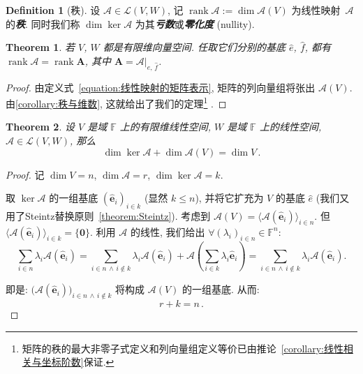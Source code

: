 \documentclass[openany]{ctexbook}
\newcommand*{\indexbf}[1]{\emph{\textbf{#1}}\index{#1}} %
\theoremstyle{plain}
\newtheorem{theorem}{Theorem}[section] %
\theoremstyle{definition}
\newtheorem{definition}{Definition}[section] %
\newcommand*{\basis}[1]{\hat{\boldsymbol{#1}}} %
\newcommand*{\bv}{\boldsymbol} %
\newcommand*{\inbasis}[2]{\left.%
	{#1}\right|_{#2}
}
\DeclareMathOperator{\rank}{rank}
\begin{document}
\begin{definition}[秩]
	设 $\mathscr A \in \mathcal L(V, W)$, 记 $\rank \mathscr A := \dim \mathscr A(V)$ 为线性映射~$\mathscr A$ 的\indexbf{秩}.
	同时我们称 $\dim \ker \mathscr A$ 为其\indexbf{亏数}或\indexbf{零化度} (nullity).
\end{definition}

\begin{theorem}
	若 $V$, $W$ 都是有限维向量空间. 任取它们分别的基底 $\hat e$, $\hat f$, 都有 $\rank \mathscr A = \rank \bv A$, 其中 $\bv A = \inbasis{\mathscr A}{\hat e,\, \hat f}$.
\end{theorem}
\begin{proof}
	由定义式~\eqref{equation:线性映射的矩阵表示}, 矩阵的列向量组将张出 $\mathscr A (V)$.
	由\ref{corollary:秩与维数}, 这就给出了我们的定理\footnote{%
	矩阵的秩的最大非零子式定义和列向量组定义等价已由推论~\ref{corollary:线性相关与坐标阶数}保证.}%
	.
\end{proof}

\begin{theorem}\label{theorem:核和像的维数}
	设 $V$ 是域 $\mathbb F$ 上的有限维线性空间, $W$ 是域 $\mathbb F$ 上的线性空间, $\mathscr A \in \mathcal L(V, W)$, 那么
	\begin{equation*}
		\dim \ker \mathscr A + \dim \mathscr A(V) = \dim V\,. 
	\end{equation*}
\end{theorem}
\begin{proof}
	记 $\dim V = n$, $\dim \mathscr A = r$, $\dim \ker \mathscr A = k$.

	取 $\ker \mathscr A$ 的一组基底 $(\basis e_i)_{i \in k}$ (显然 $k \leq n$), 并将它扩充为 $V$ 的基底 $\hat e$ (我们又用了Steintz替换原则~\ref{theorem:Steintz}).
	考虑到 $\mathscr A(V) = \langle \mathscr A(\basis e_i) \rangle_{i \in n}$.
	但 $\langle \mathscr A(\basis e_i) \rangle_{i \in k} = \{\bv 0\}$.
	利用 $\mathscr A$ 的线性, 我们给出 $\forall (\lambda_i)_{i \in n} \in \mathbb F^n$:
	\begin{equation*}
		\sum_{i \in n} \lambda_i \mathscr A(\basis e_i) 
			= \sum_{i \in n\,\wedge\, i \notin k} \lambda_i \mathscr A(\basis e_i) 
				+  \mathscr A\left( 
					\sum_{i \in k} \lambda_i \basis e_i \right)
			= \sum_{i \in n\,\wedge\, i \notin k} \lambda_i \mathscr A(\basis e_i) .
	\end{equation*}
	
	即是: $\big(\mathscr A(\basis e_i)\big)_{i \in n\,\wedge\, i \notin k}$ 将构成 $\mathscr A(V)$ 的一组基底. 从而:
	\begin{equation*}
		r + k = n\,.
	\end{equation*}
\end{proof}
\end{document}
